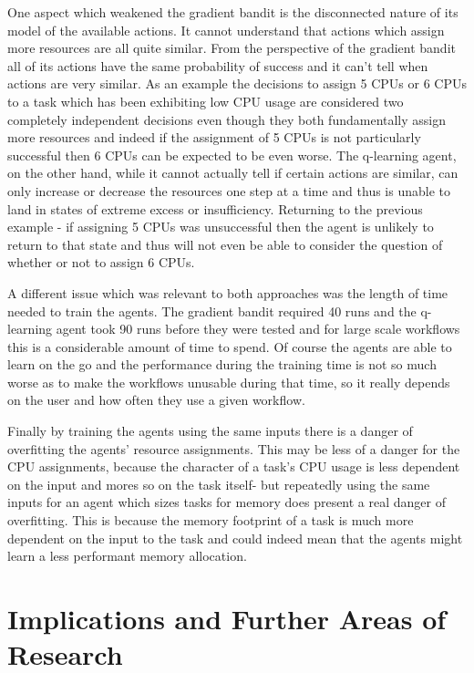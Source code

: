 One aspect which weakened the gradient bandit is the disconnected nature of its model of the available actions. It cannot understand that actions which assign more resources are all quite similar. From the perspective of the gradient bandit all of its actions have the same probability of success and it can’t tell when actions are very similar. As an example the decisions to assign 5 CPUs or 6 CPUs to a task which has been exhibiting low CPU usage are considered two completely independent decisions even though they both fundamentally assign more resources and indeed if the assignment of 5 CPUs is not particularly successful then 6 CPUs can be expected to be even worse. The q-learning agent, on the other hand, while it cannot actually tell if certain actions are similar, can only increase or decrease the resources one step at a time and thus is unable to land in states of extreme excess or insufficiency. Returning to the previous example - if assigning 5 CPUs was unsuccessful then the agent is unlikely to return to that state and thus will not even be able to consider the question of whether or not to assign 6 CPUs. 

A different issue which was relevant to both approaches was the length of time needed to train the agents. The gradient bandit required 40 runs and the q-learning agent took 90 runs before they were tested and for large scale workflows this is a considerable amount of time to spend. Of course the agents are able to learn on the go and the performance during the training time is not so much worse as to make the workflows unusable during that time, so it really depends on the user and how often they use a given workflow. 

Finally by training the agents using the same inputs there is a danger of overfitting the agents’ resource assignments. This may be less of a danger for the CPU assignments, because the character of a task’s CPU usage is less dependent on the input and mores so on the task itself- but repeatedly using the same inputs for an agent which sizes tasks for memory does present a real danger of overfitting. This is because the memory footprint of a task is much more dependent on the input to the task and could indeed mean that the agents might learn a less performant memory allocation.

\section{Implications and Further Areas of Research}
\label{sec:implications}


